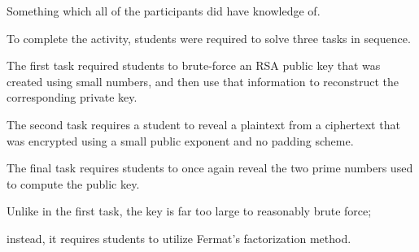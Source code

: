 Something which all of the participants did have knowledge of. 















        







    To complete the activity, students were required to solve three tasks in sequence. %







The first task required students to brute-force an RSA public key that was created using small numbers, and then use that information to reconstruct the corresponding private key. %







The second task requires a student to reveal a plaintext from a ciphertext that was encrypted using a small public exponent and no padding scheme. %







The final task requires students to once again reveal the two prime numbers used to compute the public key. %







Unlike in the first task, the key is far too large to reasonably brute force; %







instead, it requires students to utilize Fermat's factorization method. 






















